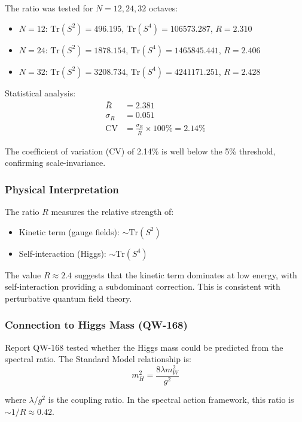 \documentclass[11pt, a4paper]{article}
\begin{document}
The ratio was tested for $N = 12, 24, 32$ octaves:
\begin{itemize}
    \item $N = 12$: $\text{Tr}(S^2) = 496.195$, $\text{Tr}(S^4) = 106573.287$, $R = 2.310$
    \item $N = 24$: $\text{Tr}(S^2) = 1878.154$, $\text{Tr}(S^4) = 1465845.441$, $R = 2.406$
    \item $N = 32$: $\text{Tr}(S^2) = 3208.734$, $\text{Tr}(S^4) = 4241171.251$, $R = 2.428$
\end{itemize}

Statistical analysis:
\begin{align}
\bar{R} &= 2.381\\
\sigma_R &= 0.051\\
\text{CV} &= \frac{\sigma_R}{\bar{R}} \times 100\% = 2.14\%
\end{align}

The coefficient of variation (CV) of 2.14\% is well below the 5\% threshold, confirming scale-invariance.

\subsubsection{Physical Interpretation}

The ratio $R$ measures the relative strength of:
\begin{itemize}
    \item Kinetic term (gauge fields): $\sim \text{Tr}(S^2)$
    \item Self-interaction (Higgs): $\sim \text{Tr}(S^4)$
\end{itemize}

The value $R \approx 2.4$ suggests that the kinetic term dominates at low energy, with self-interaction providing a subdominant correction. This is consistent with perturbative quantum field theory.

\subsubsection{Connection to Higgs Mass (QW-168)}

Report QW-168 tested whether the Higgs mass could be predicted from the spectral ratio. The Standard Model relationship is:
\begin{equation}
m_H^2 = \frac{8\lambda m_W^2}{g^2}
\end{equation}

where $\lambda/g^2$ is the coupling ratio. In the spectral action framework, this ratio is $\sim 1/R \approx 0.42$.
\end{document}
